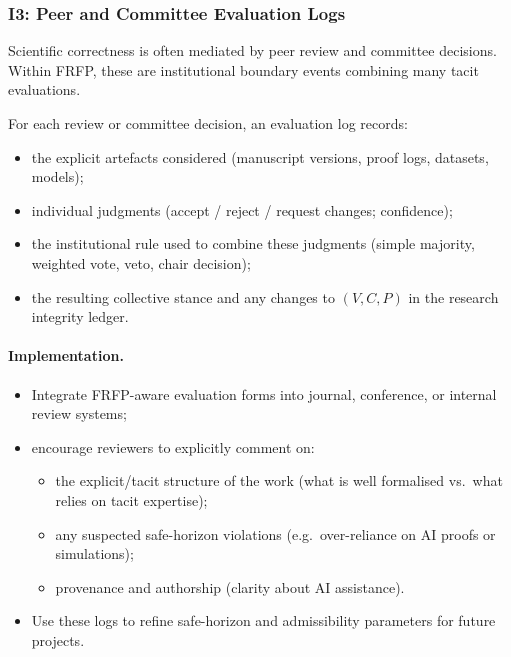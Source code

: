 \subsubsection*{I3: Peer and Committee Evaluation Logs}

Scientific correctness is often mediated by peer review and committee decisions.
Within FRFP, these are institutional boundary events combining many tacit
evaluations.

For each review or committee decision, an evaluation log records:

\begin{itemize}
  \item the explicit artefacts considered (manuscript versions, proof logs,
        datasets, models);
  \item individual judgments (accept / reject / request changes; confidence);
  \item the institutional rule used to combine these judgments (simple majority,
        weighted vote, veto, chair decision);
  \item the resulting collective stance and any changes to $(V, C, P)$ in the
        research integrity ledger.
\end{itemize}

\paragraph{Implementation.}

\begin{itemize}
  \item Integrate FRFP-aware evaluation forms into journal, conference,
        or internal review systems;
  \item encourage reviewers to explicitly comment on:
        \begin{itemize}
          \item the explicit/tacit structure of the work
                (what is well formalised vs.\ what relies on tacit expertise);
          \item any suspected safe-horizon violations
                (e.g.\ over-reliance on AI proofs or simulations);
          \item provenance and authorship (clarity about AI assistance).
        \end{itemize}
  \item Use these logs to refine safe-horizon and admissibility parameters
        for future projects.
\end{itemize}

